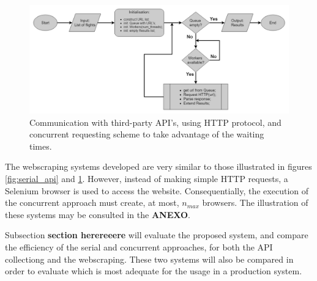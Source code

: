\begin{figure}[htpb]
  \centering
  \includegraphics[width=\textwidth]{./Figures/system_implementation/concurrent_api.png}
  \caption{Communication with third-party API's, using HTTP protocol, and concurrent requesting scheme to take advantage of the waiting times.}
  \label{fig:concurrent_api}  
\end{figure}


The webscraping systems developed are very similar to those illustrated in figures \ref{fig:serial_api} and \ref{fig:concurrent_api}. However, instead of making simple HTTP requests, a Selenium browser is used to access the website. Consequentially, the execution of the concurrent approach must create, at most, $n_{max}$ browsers. The illustration of these systems may be consulted in the \textbf{ANEXO}.

Subsection \textbf{section herereeere} will evaluate the proposed system, and compare the efficiency of the serial and concurrent approaches, for both the API collectiong and the webscraping. These two systems will also be compared in order to evaluate which is most adequate for the usage in a production system.



